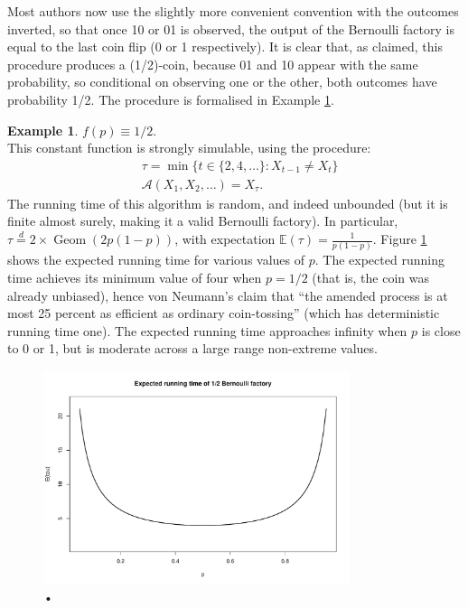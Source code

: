 \documentclass{article}
\theoremstyle{definition}
\newtheorem{example}{Example}
\newcommand{\E}{\mathbb{E}}
\newcommand{\eqdist}{\overset{d}{=}}
\newcommand{\Geom}{\operatorname{Geom}}
\newcommand{\A}{\mathcal{A}}
\begin{document}
Most authors now use the slightly more convenient convention with the outcomes inverted, so that once 10 or 01 is observed, the output of the Bernoulli factory is equal to the last coin flip (0 or 1 respectively). 
It is clear that, as claimed, this procedure produces a (1/2)-coin, because 01 and 10 appear with the same probability, so conditional on observing one or the other, both outcomes have probability 1/2.
The procedure is formalised in Example \ref{ex:const_half}.

\begin{example}\label{ex:const_half}
$f(p) \equiv 1/2$.\\
This constant function is strongly simulable, using the procedure:
\begin{align*}
& \tau = \min\{ t \in \{2,4,\dots\} : X_{t-1} \neq X_t \} \\
& \A(X_1,X_2,\dots) = X_\tau.
\end{align*}
The running time of this algorithm is random, and indeed unbounded (but it is finite almost surely, making it a valid Bernoulli factory). In particular, $\tau \eqdist 2\times\Geom(2p(1-p))$, with expectation $\E(\tau) = \frac{1}{p(1-p)}$. Figure \ref{fig:runtime_const2} shows the expected running time for various values of $p$. The expected running time achieves its minimum value of four when $p=1/2$ (that is, the coin was already unbiased), hence von Neumann's claim that ``the amended process is at most 25 percent as efficient as ordinary coin-tossing'' (which has deterministic running time one). The expected running time approaches infinity when $p$ is close to 0 or 1, but is moderate across a large range non-extreme values.
\end{example}

\begin{figure}
\centering
\includegraphics[width=0.8\textwidth]{vonneu_runtime.pdf}
\caption{•}
\label{fig:runtime_const2}
\end{figure}
\end{document}
